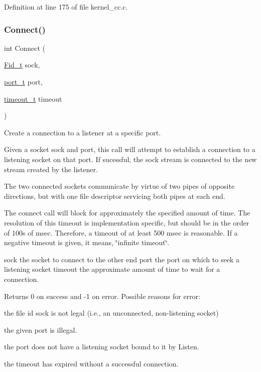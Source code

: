 Definition at line 175 of file kernel\+\_\+cc.\+c.

\mbox{\label{group__syscalls_ga747ceadd43e9a4c72b08fffbadaefbdd}} 
\subsubsection{\texorpdfstring{Connect()}{Connect()}}
{\footnotesize\ttfamily int Connect (\begin{DoxyParamCaption}\item[{\hyperlink{group__syscalls_ga5097222c5f0da97d92d4712359abc38f}{Fid\+\_\+t}}]{sock,  }\item[{\hyperlink{group__syscalls_ga13894e5a2ffd5febb7aeb90e87239d61}{port\+\_\+t}}]{port,  }\item[{\hyperlink{group__syscalls_gaf412159e5cef839836a5e7b19ee75d1c}{timeout\+\_\+t}}]{timeout }\end{DoxyParamCaption})}



Create a connection to a listener at a specific port. 

Given a socket {\ttfamily sock} and {\ttfamily port}, this call will attempt to establish a connection to a listening socket on that port. If sucessful, the {\ttfamily sock} stream is connected to the new stream created by the listener.

The two connected sockets communicate by virtue of two pipes of opposite directions, but with one file descriptor servicing both pipes at each end.

The connect call will block for approximately the specified amount of time. The resolution of this timeout is implementation specific, but should be in the order of 100\textquotesingle{}s of msec. Therefore, a timeout of at least 500 msec is reasonable. If a negative timeout is given, it means, \char`\"{}infinite timeout\char`\"{}.

sock the socket to connect to the other end  port the port on which to seek a listening socket  timeout the approximate amount of time to wait for a connection. \begin{DoxyReturn}{Returns}
0 on success and -\/1 on error. Possible reasons for error\+:
\begin{DoxyItemize}
\item the file id {\ttfamily sock} is not legal (i.\+e., an unconnected, non-\/listening socket)
\item the given port is illegal.
\item the port does not have a listening socket bound to it by {\ttfamily Listen}.
\item the timeout has expired without a successful connection. 
\end{DoxyItemize}
\end{DoxyReturn}
\mbox{\label{group__syscalls_ga284070b5fddcc3653e146e63fcbfe6e3}} 
